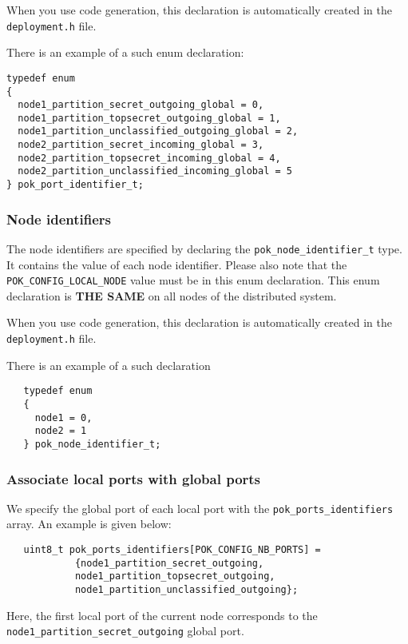    When you use code generation, this declaration is
   automatically created in the \texttt{deployment.h} file.

   There is an example of a such enum declaration:
   \begin{verbatim}
typedef enum
{
  node1_partition_secret_outgoing_global = 0,
  node1_partition_topsecret_outgoing_global = 1,
  node1_partition_unclassified_outgoing_global = 2,
  node2_partition_secret_incoming_global = 3,
  node2_partition_topsecret_incoming_global = 4,
  node2_partition_unclassified_incoming_global = 5
} pok_port_identifier_t;
   \end{verbatim}

   \subsubsection{Node identifiers}
   The node identifiers are specified by declaring the
   \texttt{pok\_node\_identifier\_t} type. It contains the value of each node
   identifier. Please also note that the \texttt{POK\_CONFIG\_LOCAL\_NODE} value
   must be in this enum declaration. This enum declaration is \textbf{THE SAME} on
   all nodes of the distributed system.

   When you use code generation, this declaration is
   automatically created in the \texttt{deployment.h} file.

   There is an example of a such declaration
   \begin{verbatim}
   typedef enum
   {
     node1 = 0,
     node2 = 1
   } pok_node_identifier_t;
   \end{verbatim}

   \subsubsection{Associate local ports with global ports}
   We specify the global port of each local port with the
   \texttt{pok\_ports\_identifiers} array. An example is given below:

   \begin{verbatim}
   uint8_t pok_ports_identifiers[POK_CONFIG_NB_PORTS] =
            {node1_partition_secret_outgoing,
            node1_partition_topsecret_outgoing,
            node1_partition_unclassified_outgoing};
   \end{verbatim}

   Here, the first local port of the current node corresponds to the
   \texttt{node1\_partition\_secret\_outgoing} global port. 

